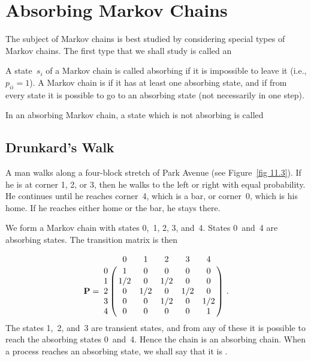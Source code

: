 \section{Absorbing Markov Chains}\label{sec 11.2}
The subject of Markov chains is best studied by considering special types of
Markov chains.  The first type that we shall study is called an 
\begin{definition}
A state~$s_i$ of a Markov chain is called \emx
{absorbing} if it is impossible
to leave
it (i.e.,
$p_{ii} = 1$).  A Markov chain is  if it has at least one
absorbing
state, and if from every state it is possible to go to an absorbing state (not
necessarily
in one step).
\end{definition}
\begin{definition}
In an absorbing Markov chain, a state which is not absorbing is
called 
\end{definition}

\subsection*{Drunkard's Walk}
\begin{example}\label{exam 11.2.1}
A man walks along a four-block stretch of Park Avenue (see Figure~\ref{fig
11.3}).  If he is
at corner 1, 2, or 3, then he walks to the left or right with equal
probability.
He continues until he reaches
corner~4, which is a bar, or corner~0, which is his home.  If he
reaches either home or the bar, he stays there.

\par
We form a Markov chain with states 0,~1, 2, 3, and~4.  States 0~and~4 are
absorbing states.  The transition matrix is then

$$
\mat{P} =\bordermatrix{
  &  0  &  1  &  2  &  3  &  4  \cr
0 &  1  &  0  &  0  &  0  &  0  \cr
1 & 1/2 &  0  & 1/2 &  0  &  0  \cr
2 &  0  & 1/2 &  0  & 1/2 &  0  \cr
3 &  0  &  0  & 1/2 &  0  & 1/2 \cr
4 &  0  &  0  &  0  &  0  &  1 \cr}\ .
$$
The states 1,~2, and~3 are transient states, and from any of these
it is possible to reach the absorbing states 0~and~4.  Hence the chain is an
absorbing chain.  When a process reaches an absorbing state, we shall say that
it is .
\end{example}

